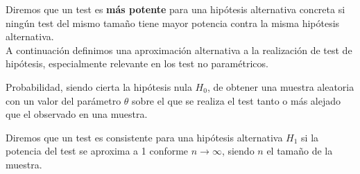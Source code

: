 	Diremos que un test es \textbf{más potente} para una hipótesis alternativa concreta si ningún test del mismo tamaño tiene mayor potencia contra la misma hipótesis alternativa.\\
	A continuación definimos una aproximación alternativa a la realización de test de hipótesis, especialmente relevante en los test no paramétricos. 
	
\begin{definicion}[$p$-valor]
	Probabilidad, siendo cierta la hipótesis nula $H_0$, de obtener una muestra aleatoria con un valor del parámetro $\theta$ sobre el que se realiza el test tanto o más alejado que el observado en una muestra. 
\end{definicion}

\begin{definicion}[Consistencia]
	Diremos que un test es consistente para una hipótesis alternativa $H_1$ si la potencia del test se aproxima a 1 conforme $n \rightarrow \infty$, siendo $n$ el tamaño de la muestra.
\end{definicion}
	